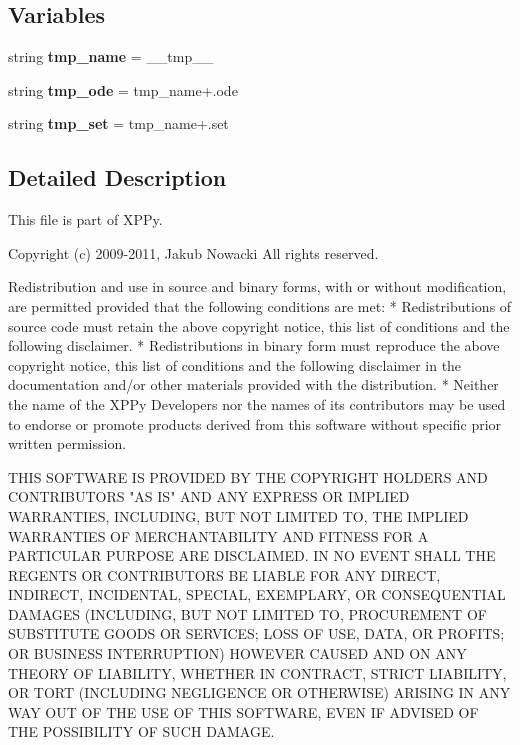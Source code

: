 \subsection*{Variables}
\begin{DoxyCompactItemize}
\item 
\mbox{\label{namespacexppy_1_1parser_1_1parse_a2228ff549cca4926a11b1ca81e9cac96}} 
string {\bfseries tmp\+\_\+name} = \textquotesingle{}\+\_\+\+\_\+tmp\+\_\+\+\_\+\textquotesingle{}
\item 
\mbox{\label{namespacexppy_1_1parser_1_1parse_a95c18175621964cb324e54d54a1d6438}} 
string {\bfseries tmp\+\_\+ode} = tmp\+\_\+name+\textquotesingle{}.ode\textquotesingle{}
\item 
\mbox{\label{namespacexppy_1_1parser_1_1parse_a34ee3293b6c4cb4ba20441bd12530cee}} 
string {\bfseries tmp\+\_\+set} = tmp\+\_\+name+\textquotesingle{}.set\textquotesingle{}
\end{DoxyCompactItemize}


\subsection{Detailed Description}
\begin{DoxyVerb}This file is part of XPPy.

Copyright (c) 2009-2011, Jakub Nowacki
All rights reserved.

Redistribution and use in source and binary forms, with or without
modification, are permitted provided that the following conditions are met:
    * Redistributions of source code must retain the above copyright
      notice, this list of conditions and the following disclaimer.
    * Redistributions in binary form must reproduce the above copyright
      notice, this list of conditions and the following disclaimer in the
      documentation and/or other materials provided with the distribution.
    * Neither the name of the XPPy Developers nor the
      names of its contributors may be used to endorse or promote products
      derived from this software without specific prior written permission.

THIS SOFTWARE IS PROVIDED BY THE COPYRIGHT HOLDERS AND CONTRIBUTORS "AS IS" AND
ANY EXPRESS OR IMPLIED WARRANTIES, INCLUDING, BUT NOT LIMITED TO, THE IMPLIED
WARRANTIES OF MERCHANTABILITY AND FITNESS FOR A PARTICULAR PURPOSE ARE
DISCLAIMED. IN NO EVENT SHALL THE REGENTS OR CONTRIBUTORS BE LIABLE FOR ANY
DIRECT, INDIRECT, INCIDENTAL, SPECIAL, EXEMPLARY, OR CONSEQUENTIAL DAMAGES
(INCLUDING, BUT NOT LIMITED TO, PROCUREMENT OF SUBSTITUTE GOODS OR SERVICES;
LOSS OF USE, DATA, OR PROFITS; OR BUSINESS INTERRUPTION) HOWEVER CAUSED AND
ON ANY THEORY OF LIABILITY, WHETHER IN CONTRACT, STRICT LIABILITY, OR TORT
(INCLUDING NEGLIGENCE OR OTHERWISE) ARISING IN ANY WAY OUT OF THE USE OF THIS
SOFTWARE, EVEN IF ADVISED OF THE POSSIBILITY OF SUCH DAMAGE.
\end{DoxyVerb}
 

